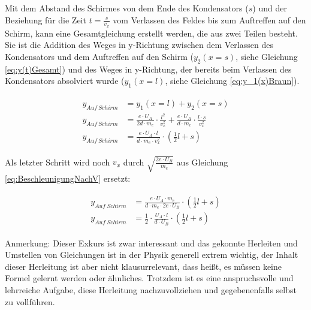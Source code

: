 \noindent Mit dem Abstand des Schirmes von dem Ende des Kondensators ($s$) und der Beziehung für die Zeit $t=\frac{s}{v_x}$ vom Verlassen des Feldes bis zum Auftreffen auf den Schirm, kann eine Gesamtgleichung erstellt werden, die aus zwei Teilen besteht. Sie ist die Addition des Weges in y-Richtung zwischen dem Verlassen des Kondensators und dem Auftreffen auf den Schirm ($y_2(x=s)$, siehe Gleichung \ref{eq:y(t)Gesamt}) und des Weges in y-Richtung, der bereits beim Verlassen des Kondensators absolviert wurde ($y_1(x=l)$, siehe Gleichung \ref{eq:y_1(x)Braun}).

\begin{align} \label{eq:yGesamtAnsatz}
\begin{split}
	y_{Auf \ Schirm} &= y_1(x=l) + y_2(x=s) \\
	y_{Auf \ Schirm} &= \frac{e \cdot U_A}{2d \cdot m_e} \cdot \frac{l^2}{v_{x}^2}
				      + \frac{e \cdot U_A}{d \cdot m_e} \cdot \frac{l \cdot s}{v_{x}^2} \\
	y_{Auf \ Schirm} &= \frac{e \cdot U_A \cdot l}{d \cdot m_e \cdot v_{x}^2} \cdot (\frac{1}{2}l + s)
\end{split}
\end{align}

Als letzter Schritt wird noch $v_{x}$ durch $\sqrt{\frac{2e \cdot U_B}{m_e}}$ aus Gleichung \ref{eq:BeschleunigungNachV} ersetzt:

\begin{align} \label{eq:yGesamt}
\begin{split}
	y_{Auf \ Schirm} &= \frac{e \cdot U_A \cdot m_e}{d \cdot m_e \cdot 2e \cdot U_B} \cdot (\frac{1}{2}l + s) \\
	y_{Auf \ Schirm} &= \frac{1}{2} \cdot \frac{U_A \cdot l}{d \cdot U_B} \cdot (\frac{1}{2}l + s)
\end{split}
\end{align}

\begin{leftbar}
Anmerkung: Dieser Exkurs ist zwar interessant und das gekonnte Herleiten und Umstellen von Gleichungen ist in der Physik generell extrem wichtig, der Inhalt dieser Herleitung ist aber nicht klausurrelevant, dass heißt, es müssen keine Formel gelernt werden oder ähnliches. Trotzdem ist es eine anspruchsvolle und lehrreiche Aufgabe, diese Herleitung nachzuvollziehen und gegebenenfalls selbst zu vollführen.
\end{leftbar}




